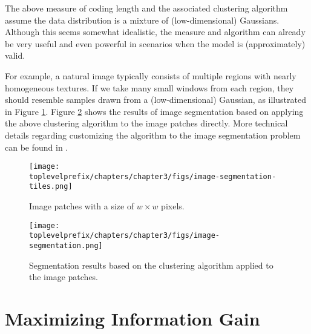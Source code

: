 \documentclass[../../book-main.tex]{subfiles}
\begin{document}

\begin{example}\label{eg:image-segmentation} The above measure of coding length and the associated clustering algorithm assume the data distribution is a mixture of (low-dimensional) Gaussians. Although this seems somewhat idealistic, the measure and algorithm can already be very useful and even powerful in scenarios when the model is (approximately) valid.

	For example, a natural image typically consists of multiple regions with nearly homogeneous textures. If we take many small windows from each region, they should resemble samples drawn from a (low-dimensional) Gaussian, as illustrated in Figure \ref{fig:image-patch}. Figure \ref{fig:image-segmentation} shows the results of image segmentation based on applying the above clustering algorithm to the image patches directly. More technical details regarding customizing the algorithm to the image segmentation problem can be found in \cite{Mobahi-IJCV2011}.
\end{example}


\begin{figure}
	\centering
	\texttt{[image: \\toplevelprefix/chapters/chapter3/figs/image-segmentation-tiles.png]}
	\caption{Image patches with a size of $w\times w$ pixels.}
	\label{fig:image-patch}
\end{figure}

\begin{figure}[th]
	\centering
	\texttt{[image: \\toplevelprefix/chapters/chapter3/figs/image-segmentation.png]}
	\caption{Segmentation results based on the clustering algorithm applied to the image patches.}
	\label{fig:image-segmentation}
\end{figure}

\section{Maximizing Information Gain}
\label{sec:chap4-representation-learning-problem}


\end{document}
